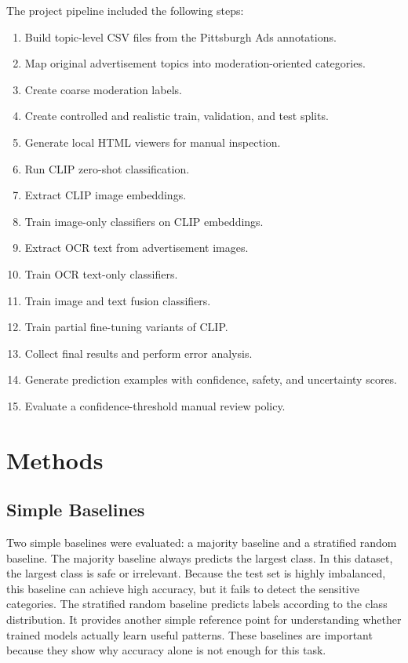 \documentclass[12pt]{article}
\begin{document}
The project pipeline included the following steps:
\begin{enumerate}
    \item Build topic-level CSV files from the Pittsburgh Ads annotations.
    \item Map original advertisement topics into moderation-oriented categories.
    \item Create coarse moderation labels.
    \item Create controlled and realistic train, validation, and test splits.
    \item Generate local HTML viewers for manual inspection.
    \item Run CLIP zero-shot classification.
    \item Extract CLIP image embeddings.
    \item Train image-only classifiers on CLIP embeddings.
    \item Extract OCR text from advertisement images.
    \item Train OCR text-only classifiers.
    \item Train image and text fusion classifiers.
    \item Train partial fine-tuning variants of CLIP.
    \item Collect final results and perform error analysis.
    \item Generate prediction examples with confidence, safety, and uncertainty scores.
    \item Evaluate a confidence-threshold manual review policy.
\end{enumerate}

\section{Methods}

\subsection{Simple Baselines}

Two simple baselines were evaluated: a majority baseline and a stratified random baseline. The majority baseline always predicts the largest class. In this dataset, the largest class is safe or irrelevant. Because the test set is highly imbalanced, this baseline can achieve high accuracy, but it fails to detect the sensitive categories. The stratified random baseline predicts labels according to the class distribution. It provides another simple reference point for understanding whether trained models actually learn useful patterns. These baselines are important because they show why accuracy alone is not enough for this task.
\end{document}
